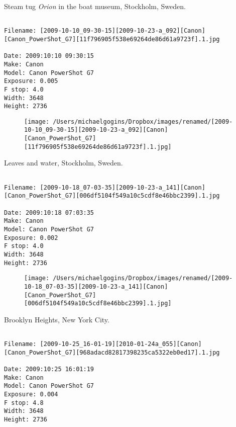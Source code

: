 \clearpage
\onecolumn
\noindent Steam tug \emph{Orion} in the boat museum, Stockholm, Sweden.
\noindent
\begin{lstlisting}

Filename: [2009-10-10_09-30-15][2009-10-23-a_092][Canon][Canon_PowerShot_G7][11f796905f538e69264de86d61a9723f].1.jpg

Date: 2009:10:10 09:30:15
Make: Canon
Model: Canon PowerShot G7
Exposure: 0.005
F stop: 4.0
Width: 3648
Height: 2736
\end{lstlisting}
\clearpage

\begin{figure}
\texttt{[image: /Users/michaelgogins/Dropbox/images/renamed/[2009-10-10\_09-30-15][2009-10-23-a\_092][Canon][Canon\_PowerShot\_G7][11f796905f538e69264de86d61a9723f].1.jpg]}
\end{figure}
    
\clearpage
\onecolumn
\noindent Leaves and water, Stockholm, Sweden.
\noindent
\begin{lstlisting}

Filename: [2009-10-18_07-03-35][2009-10-23-a_141][Canon][Canon_PowerShot_G7][006df5104f549a10c5cdf8e46bbc2399].1.jpg

Date: 2009:10:18 07:03:35
Make: Canon
Model: Canon PowerShot G7
Exposure: 0.002
F stop: 4.0
Width: 3648
Height: 2736
\end{lstlisting}
\clearpage

\begin{figure}
\texttt{[image: /Users/michaelgogins/Dropbox/images/renamed/[2009-10-18\_07-03-35][2009-10-23-a\_141][Canon][Canon\_PowerShot\_G7][006df5104f549a10c5cdf8e46bbc2399].1.jpg]}
\end{figure}
    
\clearpage
\onecolumn
\noindent Brooklyn Heights, New York City.
\noindent
\begin{lstlisting}

Filename: [2009-10-25_16-01-19][2010-01-24a_055][Canon][Canon_PowerShot_G7][968adacd82817398235ca5322eb0ed17].1.jpg

Date: 2009:10:25 16:01:19
Make: Canon
Model: Canon PowerShot G7
Exposure: 0.004
F stop: 4.8
Width: 3648
Height: 2736
\end{lstlisting}
\clearpage

